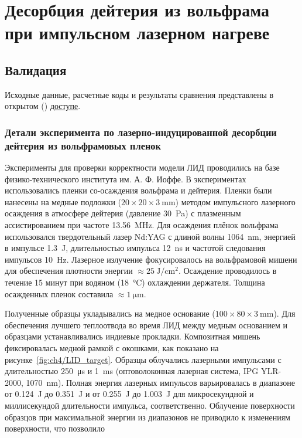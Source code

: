 \chapter{Десорбция дейтерия из вольфрама при импульсном лазерном нагреве}\label{ch:ch4}

\section{Валидация}\label{sec:ch4/sec1}

Исходные данные, расчетные коды и результаты сравнения представлены в открытом () \href{https://github.com/KulaginVladimir/LID-validation}{доступе}.

\subsection{Детали эксперимента по лазерно-индуцированной десорбции дейтерия из вольфрамовых пленок}\label{subsec:ch4/sec1/subsec1}

Эксперименты для проверки корректности модели ЛИД проводились на базе физико-технического института им. А. Ф. Иоффе. В экспериментах использовались пленки со-осаждения вольфрама и дейтерия. Пленки были нанесены на медные подложки ($20 \times 20 \times \SI{3}{\milli\metre}$) методом импульсного лазерного осаждения в атмосфере дейтерия (давление \SI{30}{\pascal}) с плазменным ассистированием при частоте \SI{13.56}{\mega\hertz}. Для осаждения плёнок вольфрама использовался твердотельный лазер Nd:YAG с длиной волны \SI{1064}{\nano\meter}, энергией в импульсе \SI{1.3}{\joule}, длительностью импульса \SI{12}{\nano\second} и частотой следования импульсов \SI{10}{\hertz}. Лазерное излучение фокусировалось на вольфрамовой мишени для обеспечения плотности энергии $\approx\SI{25}{\joule\per\centi\meter\squared}$. Осаждение проводилось в течение 15 минут при водяном (\SI{18}{\degreeCelsius}) охлаждении держателя. Толщина осажденных пленок составила $\approx\SI{1}{\micro\metre}$.

Полученные образцы укладывались на медное основание ($100 \times 80 \times \SI{3}{\milli\metre}$). Для обеспечения лучшего теплоотвода во время ЛИД между медным основанием и образцами устанавливались индиевые прокладки. Композитная мишень фиксировалась медной рамкой с окошками, как показано на рисунке~\cref{fig:ch4/LID_target}. Образцы облучались лазерными импульсами с длительностью \SI{250}{\micro\second} и \SI{1}{\milli\second} (оптоволоконная лазерная система, IPG YLR-2000, \SI{1070}{\nano\metre}). Полная энергия лазерных импульсов варьировалась в диапазоне от \SI{0.124}{\joule} до \SI{0.351}{\joule} и от \SI{0.255}{\joule} до \SI{1.003}{\joule} для микросекундной и миллисекундой длительности импульса, соответственно. Облучение поверхности образцов при максимальной энергии из диапазонов не приводило к изменениям поверхности, что позволило

